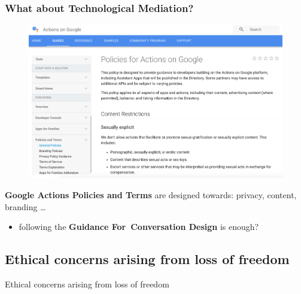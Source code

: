 \documentclass{beamer}
\begin{document}
\begin{frame}
\frametitle{What about Technological Mediation? }
\vspace{-0.6cm}
\begin{figure}
	\centering
	\includegraphics[width=0.85\linewidth]{images/dev_policy}
	\label{fig:devpolicy}
\end{figure}

\textbf{Google Actions Policies and Terms} are designed towards: privacy, content, branding \dots
\begin{itemize}
	\item following the \textbf{Guidance For Conversation Design} is enough?
\end{itemize}
\end{frame}

\subsection{Ethical concerns arising from loss of freedom}
\begin{frame}
\begin{center} 
	 Ethical concerns arising from loss of freedom
\end{center}
\end{frame}
\end{document}
